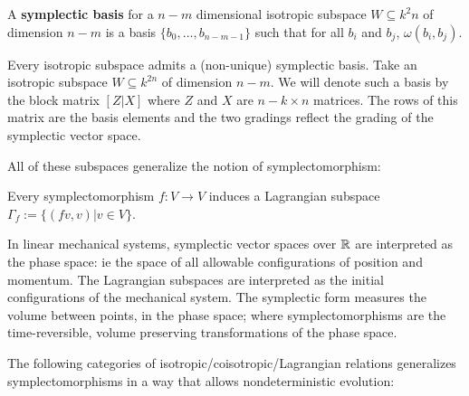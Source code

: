 \begin{definition}
A {\bf symplectic basis} for a $n-m$ dimensional isotropic subspace $W \subseteq k^2n$ of dimension $n-m$ is a basis $\{b_0,\ldots, b_{n-m-1}\}$ such that for all $b_i$ and $b_j$, $\omega(b_i,b_j)$.
\end{definition}

Every isotropic subspace admits a (non-unique) symplectic basis.  Take an isotropic subspace $W \subseteq k^{2n}$ of dimension $n-m$.  We will denote such a basis by the block matrix $[Z|X]$ where $Z$ and $X$ are  $n-k\times n$ matrices.  The rows of this matrix are the basis elements and the two gradings reflect the grading of the symplectic vector space.


All of these subspaces generalize the notion of symplectomorphism:

\begin{lemma}
Every symplectomorphism $f:V\to V$ induces a Lagrangian subspace $\Gamma_f:=\{ (fv, v) | v \in V \}$.
\end{lemma}



In linear mechanical systems, symplectic vector spaces over $\mathbb{R}$ are interpreted as  the phase space: ie the space of all allowable configurations of position and momentum.  The Lagrangian subspaces are interpreted as the initial configurations of the mechanical system. The symplectic form measures the volume between points, in the phase space; where symplectomorphisms are the time-reversible, volume preserving transformations of the phase space.

The following  categories of isotropic/coisotropic/Lagrangian relations generalizes symplectomorphisms in a way that allows nondeterministic evolution:


